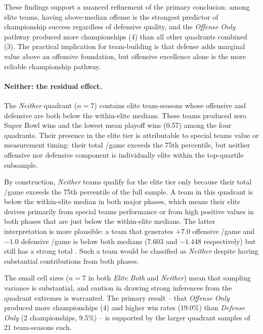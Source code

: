 These findings support a nuanced refinement of the primary conclusion: among
elite teams, having above-median offense is the strongest predictor of
championship success regardless of defensive quality, and the \textit{Offense
Only} pathway produced more championships (4) than all other quadrants combined
(3). The practical implication for team-building is that defense adds marginal
value above an offensive foundation, but offensive excellence alone is the more
reliable championship pathway.

\paragraph{Neither: the residual effect.}
The \textit{Neither} quadrant ($n = 7$) contains elite team-seasons whose
offensive and defensive \xvoa{} are both below the within-elite medians. These
teams produced zero Super Bowl wins and the lowest mean playoff wins (0.57)
among the four quadrants. Their presence in the elite tier is attributable to
special teams value or measurement timing: their total \gds{}/game exceeds the
75th percentile, but neither offensive nor defensive component is individually
elite within the top-quartile subsample.

By construction, \textit{Neither} teams qualify for the elite tier only because
their total \gds{}/game exceeds the 75th percentile of the full sample. A team
in this quadrant is below the within-elite median in both major phases, which
means their elite \gds{} derives primarily from special teams performance or
from high positive values in both phases that are just below the within-elite
medians. The latter interpretation is more plausible: a team that generates
$+7.0$ offensive \xvoa{}/game and $-1.0$ defensive \xvoa{}/game is below both
medians ($7.603$ and $-1.448$ respectively) but still has a strong total \gds{}.
Such a team would be classified as \textit{Neither} despite having substantial
contributions from both phases.

The small cell sizes ($n = 7$ in both \textit{Elite Both} and \textit{Neither})
mean that sampling variance is substantial, and caution in drawing strong
inferences from the quadrant extremes is warranted. The primary result -- that
\textit{Offense Only} produced more championships (4) and higher win rates
(19.0\%) than \textit{Defense Only} (2 championships, 9.5\%) -- is supported by
the larger quadrant samples of 21 team-seasons each.

